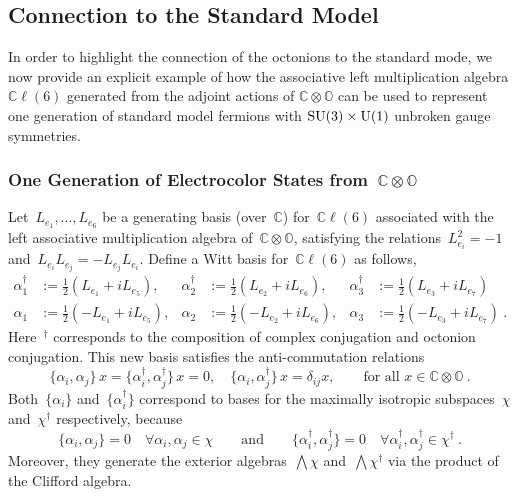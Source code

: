 \documentclass[reqno,11pt]{amsart}
\numberwithin{equation}{section}
\newcommand{\1}{\mbox{\rm 1 \hspace{-1.05 em} 1}}
\newcommand{\U}{{\rm{U}}}
\newcommand{\SU}{{\rm{SU}}}
\newcommand{\bb}[1]{\mathbb{#1}}
\begin{document}
\subsection{Connection to the Standard Model} \label{sec:octsm}
In order to highlight the connection of the octonions to the standard mode, we now provide an explicit example of how the associative left multiplication algebra $\bb{C}\ell(6)$ generated from the adjoint actions of $\bb{C}\otimes\bb{O}$ can be used to represent one generation of standard model fermions with $\SU(3)\times \U(1)$ unbroken gauge symmetries.

\subsubsection{One Generation of Electrocolor States from~$\bb{C}\otimes\bb{O}$} \label{Furey}
Let~$L_{e_1},...,L_{e_6}$ be a generating basis (over~$\bb{C}$) for~$\bb{C}\ell(6)$ associated with the left associative multiplication algebra of~$\bb{C}\otimes\bb{O}$, satisfying the relations~$L_{e_i}^2=-1$ and~$L_{e_i}L_{e_j}=-L_{e_j}L_{e_i}$. Define a Witt basis for~$\bb{C}\ell(6)$ as follows,
\begin{align*}
\alpha_1^\dagger &:= \frac{1}{2}(L_{e_1}+iL_{e_5}),& \alpha_2^\dagger &:= \frac{1}{2}(L_{e_2}+iL_{e_6}),& \alpha_3^\dagger &:= \frac{1}{2}(L_{e_3}+iL_{e_7}) \\
\alpha_1 &:= \frac{1}{2}(-L_{e_1}+iL_{e_5}), & \alpha_2 &:= \frac{1}{2}(-L_{e_2}+iL_{e_6}),& \alpha_3 &:= \frac{1}{2}(-L_{e_3}+iL_{e_7}) \:.
\end{align*}
Here~${}^{\dagger}$ corresponds to the composition of complex conjugation and octonion conjugation. This new basis satisfies the anti-commutation relations
\[ \{\alpha_i,\alpha_j\}\, x = \{\alpha_i^{\dagger},\alpha_j^{\dagger}\}\, x=0,
\quad\{\alpha_i,\alpha_j^{\dagger}\}\, x=\delta_{ij}x,\qquad \text{for all~$x\in\bb{C}\otimes\bb{O}$} \:. \]
Both~$\{\alpha_i\}$ and~$\{\alpha_i^{\dagger}\}$ correspond to bases for the maximally  isotropic subspaces~$\chi$ and~$\chi^{\dagger}$ respectively, because
\[ \{\alpha_i,\alpha_j\}=0 \quad \forall \alpha_i,\alpha_j\in \chi
\qquad \text{and} \qquad \{\alpha_i^{\dagger},\alpha_j^{\dagger}\}=0 \quad \forall \alpha_i^{\dagger},\alpha_j^{\dagger}\in\chi^{\dagger} \:. \]
Moreover, they generate the exterior algebras~$\bigwedge \chi$ and~$\bigwedge\chi^{\dagger}$ via the product of the Clifford algebra.
\end{document}
